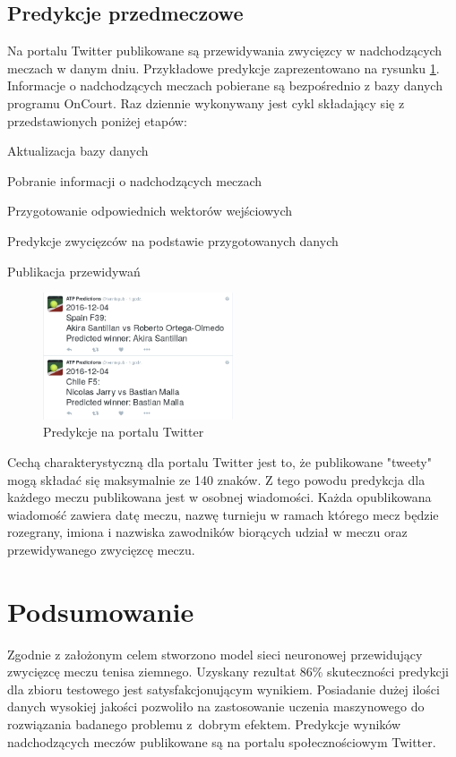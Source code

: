 \section{Predykcje przedmeczowe}
\label{Sec:PredykcjePrzed}
Na portalu Twitter publikowane są przewidywania zwycięzcy w nadchodzących meczach w danym dniu. Przykładowe predykcje zaprezentowano na rysunku \ref{fig:preds}. Informacje o nadchodzących meczach pobierane są bezpośrednio z bazy danych programu OnCourt. Raz dziennie wykonywany jest cykl składający się z przedstawionych poniżej etapów:
\begin{tightitemize}
\item Aktualizacja bazy danych
\item Pobranie informacji o nadchodzących meczach
\item Przygotowanie odpowiednich wektorów wejściowych
\item Predykcje zwycięzców na podstawie przygotowanych danych
\item Publikacja przewidywań
\end{tightitemize}

\begin{figure}
\centering
\includegraphics[width=0.5\textwidth]{atp_pred.png}
\caption{Predykcje na portalu Twitter}
\label{fig:preds}
\end{figure}

Cechą charakterystyczną dla portalu Twitter jest to, że publikowane "tweety" mogą składać się maksymalnie ze 140 znaków. Z tego powodu predykcja dla każdego meczu publikowana jest w osobnej wiadomości. Każda opublikowana wiadomość zawiera datę meczu, nazwę turnieju w ramach którego mecz będzie rozegrany, imiona i nazwiska zawodników biorących udział w meczu oraz przewidywanego zwycięzcę meczu.

\chapter{Podsumowanie}
Zgodnie z założonym celem stworzono model sieci neuronowej przewidujący zwycięzcę meczu tenisa ziemnego. Uzyskany rezultat 86\% skuteczności predykcji dla zbioru testowego jest satysfakcjonującym wynikiem. Posiadanie dużej ilości danych wysokiej jakości pozwoliło na zastosowanie uczenia maszynowego do rozwiązania badanego problemu z~dobrym efektem. Predykcje wyników nadchodzących meczów publikowane są na portalu społecznościowym Twitter.

